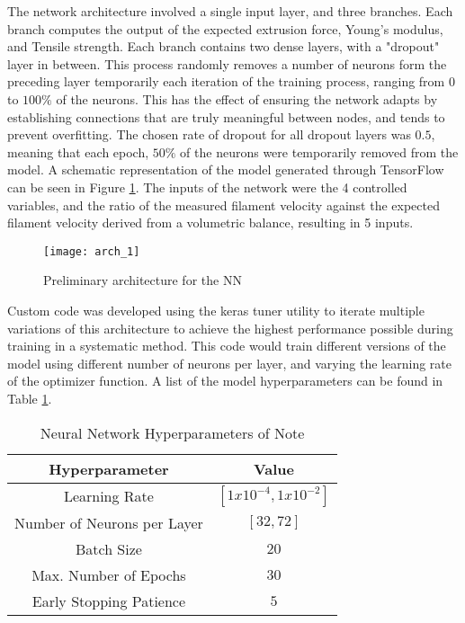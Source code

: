 \documentclass[main.tex]{subfiles}
\begin{document}
The network architecture involved a single input layer, and three branches. Each branch computes the output of the expected extrusion force, Young's modulus, and Tensile strength. Each branch contains two dense layers, with a "dropout" layer in between. This process randomly removes a number of neurons form the preceding layer temporarily each iteration of the training process, ranging from $0$ to $100\%$ of the neurons. This has the effect of ensuring the network adapts by establishing connections that are truly meaningful between nodes, and tends to prevent overfitting. The chosen rate of dropout for all dropout layers was $0.5$, meaning that each epoch, $50\%$ of the neurons were temporarily removed from the model. A schematic representation of the model generated through TensorFlow can be seen in Figure \ref{fig:arch1}. The inputs of the network were the 4 controlled variables, and the ratio of the measured filament velocity against the expected filament velocity derived from a volumetric balance, resulting in 5 inputs.  

\begin{figure}[h]
	\center
	\texttt{[image: arch\_1]}
	\caption{Preliminary architecture for the NN} \label{fig:arch1}
\end{figure}

Custom code was developed using the keras tuner utility to iterate multiple variations of this architecture to achieve the highest performance possible during training in a systematic method. This code would train different versions of the model using different number of neurons per layer, and varying the learning rate of the optimizer function. A list of the model hyperparameters can be found in Table \ref{tab:nn1_hp}.

\begin{table}[!htbp] %
	\renewcommand{\arraystretch}{1.5}
	\centering
	\caption{Neural Network Hyperparameters of Note}
	\label{tab:nn1_hp}
	\begin{tabular}{ c c } 
		\toprule
		\textbf{Hyperparameter} & \textbf{Value} \\
		\midrule
		Learning Rate  &  $[1x10^{-4}, 1x10^{-2}]$\\
		Number of Neurons per Layer  & $[32,72]$\\
		Batch Size & $20$\\
		Max. Number of Epochs & $30$\\
		Early Stopping Patience & $5$\\
		\bottomrule
	\end{tabular}	
\end{table}
\end{document}
